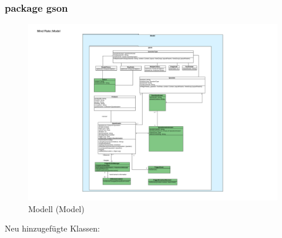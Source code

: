 \documentclass[a4paper]{scrreprt}
\begin{document}
                \subsubsection{package gson}
                    \begin{figure}[H]
                        \centering
                        \includegraphics[scale = 0.9]{Model.pdf}
                        \caption{Modell (Model)}
                    \end{figure}              
                   \par Neu hinzugefügte Klassen:
\end{document}
